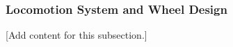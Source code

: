 
\subsubsection{Locomotion System and Wheel Design}
\label{subsubsec:design_3_2_locomotion_wheel_design}

[Add content for this subsection.]
